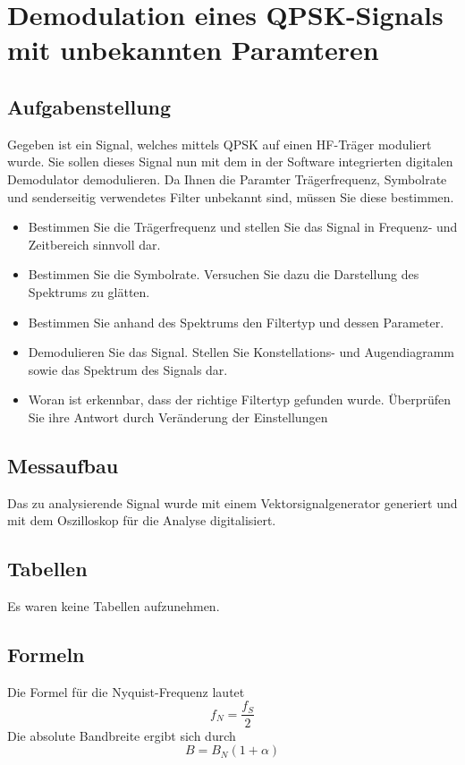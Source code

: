 \documentclass[12pt,a4paper,ngerman]{article}
\begin{document}


%
%

\section{Demodulation eines QPSK-Signals mit unbekannten Paramteren}
\subsection{Aufgabenstellung}
Gegeben ist ein Signal, welches mittels QPSK auf einen HF-Träger moduliert wurde. Sie sollen dieses Signal nun mit dem in der Software integrierten digitalen Demodulator demodulieren. Da Ihnen die Paramter Trägerfrequenz, Symbolrate und senderseitig verwendetes Filter unbekannt sind, müssen Sie diese bestimmen.
\begin{itemize}
\item Bestimmen Sie die Trägerfrequenz und stellen Sie das Signal in Frequenz- und Zeitbereich sinnvoll dar. 
\item Bestimmen Sie die Symbolrate. Versuchen Sie dazu die Darstellung des Spektrums zu glätten.
\item Bestimmen Sie anhand des Spektrums den Filtertyp und dessen Parameter.
\item Demodulieren Sie das Signal. Stellen Sie Konstellations- und Augendiagramm sowie das Spektrum des Signals dar. 
\item Woran ist erkennbar, dass der richtige Filtertyp gefunden wurde. Überprüfen Sie ihre Antwort durch Veränderung der Einstellungen
\end{itemize}
\subsection{Messaufbau}
Das zu analysierende Signal wurde mit einem Vektorsignalgenerator generiert und mit dem Oszilloskop für die Analyse digitalisiert.  
\subsection{Tabellen}
Es waren keine Tabellen aufzunehmen. 
\subsection{Formeln}
Die Formel für die Nyquist-Frequenz lautet
\begin{equation}
f_N = \frac{f_S}{2}
\end{equation}
Die absolute Bandbreite ergibt sich durch
\begin{equation}
B = B_N (1+\alpha)
\end{equation}
\end{document}
